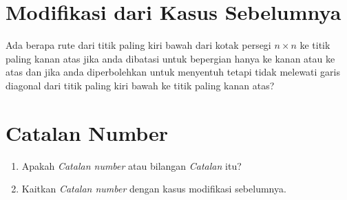 \documentclass{article}
\theoremstyle{plain}
\begin{document}
\section*{Modifikasi dari Kasus Sebelumnya}
Ada berapa rute dari titik paling kiri bawah dari kotak persegi $n \times n$ ke titik paling kanan atas jika anda dibatasi untuk bepergian hanya ke kanan atau ke atas dan jika anda diperbolehkan untuk menyentuh tetapi tidak melewati garis diagonal dari titik paling kiri bawah ke titik paling kanan atas?

\section*{Catalan Number}
	\begin{enumerate}[-,topsep=0pt, nosep,label=\alph*. ]
		\item Apakah \textit{Catalan number} atau bilangan \textit{Catalan} itu?
		\item Kaitkan \textit{Catalan number} dengan kasus modifikasi sebelumnya.
	\end{enumerate}



%
%
%    
%    
%    
%    
%




\end{document}
